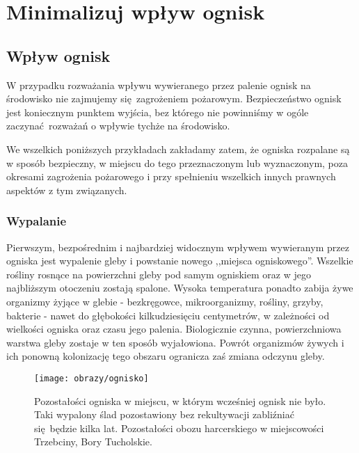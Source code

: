 
\chapter{Minimalizuj wpływ ognisk}
\label{rule4-fire}

\section{Wpływ ognisk}

W przypadku rozważania wpływu wywieranego przez palenie ognisk na środowisko nie zajmujemy się zagrożeniem pożarowym. Bezpieczeństwo ognisk jest koniecznym punktem wyjścia, bez którego nie powinniśmy w ogóle zaczynać rozważań o wpływie tychże na środowisko. 

We wszelkich poniższych przykładach zakładamy zatem, że ogniska rozpalane są w sposób bezpieczny, w miejscu do tego przeznaczonym lub wyznaczonym, poza okresami zagrożenia pożarowego i przy spełnieniu wszelkich innych prawnych aspektów z tym związanych.

\subsection{Wypalanie}

Pierwszym, bezpośrednim i najbardziej widocznym wpływem wywieranym przez ogniska jest wypalenie gleby i powstanie nowego ,,miejsca ogniskowego''. Wszelkie rośliny rosnące na powierzchni gleby pod samym ogniskiem oraz w jego najbliższym otoczeniu zostają spalone. Wysoka temperatura ponadto zabija żywe organizmy żyjące w glebie - bezkręgowce, mikroorganizmy, rośliny, grzyby, bakterie -  nawet do głębokości kilkudziesięciu centymetrów, w zależności od wielkości ogniska oraz czasu jego palenia.
Biologicznie czynna, powierzchniowa warstwa gleby zostaje w ten sposób wyjałowiona. Powrót organizmów żywych i ich ponowną kolonizację tego obszaru ogranicza zaś zmiana odczynu gleby.

\begin{minipage}{0.5\textwidth}

\begin{figure}[!hb]
	\texttt{[image: obrazy/ognisko]}
	\caption[Wypalone ognisko.]{Pozostałości ogniska w miejscu, w którym wcześniej ognisk nie było. Taki wypalony ślad pozostawiony bez rekultywacji zabliźniać się będzie kilka lat. Pozostałości obozu harcerskiego w miejscowości Trzebciny, Bory Tucholskie.}
\end{figure}

\end{minipage}

